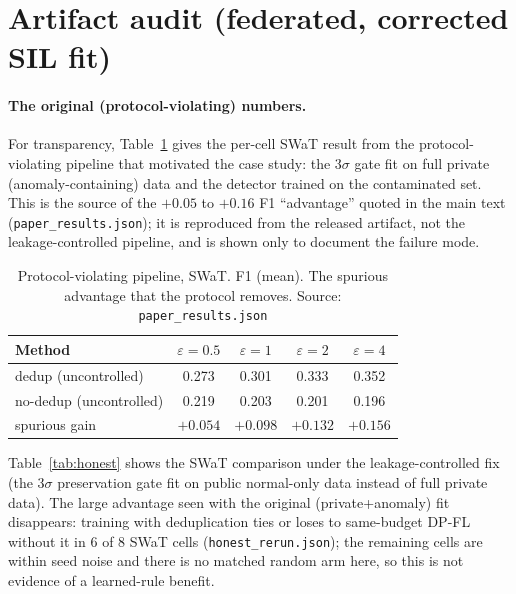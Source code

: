 \documentclass{article}
\providecommand{\botrule}{\bottomrule}%
\begin{document}
\section{Artifact audit (federated, corrected SIL fit)}\label{supp:artifact}
\paragraph{The original (protocol-violating) numbers.} For transparency, Table~\ref{tab:naive}
gives the per-cell SWaT result from the protocol-violating pipeline that motivated the case study: the
$3\sigma$ gate fit on full private (anomaly-containing) data and the detector trained on the
contaminated set. This is the source of the $+0.05$ to $+0.16$ F1 ``advantage'' quoted in the
main text (\texttt{paper\_results.json}); it is reproduced from the released artifact, not the leakage-controlled pipeline, and is shown only to document the failure mode.

\begin{table}[h]\centering
\caption{Protocol-violating pipeline, SWaT. F1 (mean). The spurious advantage that
the protocol removes. Source: \texttt{paper\_results.json}}\label{tab:naive}
\begin{tabular}{@{}lcccc@{}}
\toprule
Method & $\varepsilon{=}0.5$ & $\varepsilon{=}1$ & $\varepsilon{=}2$ & $\varepsilon{=}4$ \\
\midrule
dedup (uncontrolled)    & 0.273 & 0.301 & 0.333 & 0.352 \\
no-dedup (uncontrolled)    & 0.219 & 0.203 & 0.201 & 0.196 \\
\midrule
spurious gain    & $+0.054$ & $+0.098$ & $+0.132$ & $+0.156$ \\
\botrule
\end{tabular}
\end{table}

Table~\ref{tab:honest} shows the SWaT comparison under the leakage-controlled fix (the
$3\sigma$ preservation gate fit on public normal-only data instead of full private data).
The large advantage seen with the original (private+anomaly) fit disappears: training with
deduplication ties or loses to same-budget DP-FL without it in $6$ of $8$ SWaT cells
(\texttt{honest\_rerun.json}); the remaining cells are within seed noise and there is no
matched random arm here, so this is not evidence of a learned-rule benefit.
\end{document}
